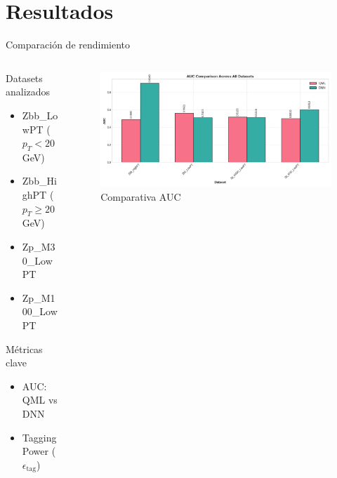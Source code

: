 \documentclass[aspectratio=169]{beamer}
\begin{document}
\section{Resultados}
\begin{frame}{Comparación de rendimiento}
  \begin{columns}
    \begin{column}{0.46\textwidth}
      \begin{block}{Datasets analizados}
        \begin{itemize}
          \item Zbb\_LowPT (\texorpdfstring{$p_T < 20$}{pT < 20} GeV)
          \item Zbb\_HighPT (\texorpdfstring{$p_T \geq 20$}{pT >= 20} GeV)
          \item Zp\_M30\_LowPT
          \item Zp\_M100\_LowPT
        \end{itemize}
      \end{block}
      \vspace{-0.2em}
      \begin{alertblock}{Métricas clave}
        \begin{itemize}
          \item AUC: QML vs DNN
          \item Tagging Power (\texorpdfstring{$\epsilon_{\text{tag}}$}{epsilon})
        \end{itemize}
      \end{alertblock}
    \end{column}
    \begin{column}{0.52\textwidth}
      \begin{figure}
        \includegraphics[width=\textwidth]{resumen_hmmm/auc_all_datasets.png}
        \caption{\small Comparativa AUC}
      \end{figure}
    \end{column}
  \end{columns}
\end{frame}
\end{document}
